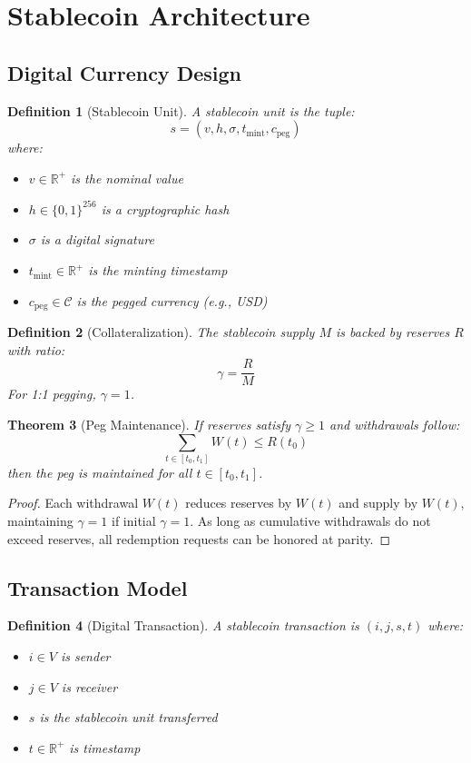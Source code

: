 \documentclass[12pt]{article}
\newtheorem{theorem}{Theorem}
\newtheorem{definition}[theorem]{Definition}
\begin{document}
\section{Stablecoin Architecture}

\subsection{Digital Currency Design}

\begin{definition}[Stablecoin Unit]
A stablecoin unit is the tuple:
$$
s = (v, h, \sigma, t_{\text{mint}}, c_{\text{peg}})
$$
where:
\begin{itemize}
    \item $v \in \mathbb{R}^+$ is the nominal value
    \item $h \in \{0,1\}^{256}$ is a cryptographic hash
    \item $\sigma$ is a digital signature
    \item $t_{\text{mint}} \in \mathbb{R}^+$ is the minting timestamp
    \item $c_{\text{peg}} \in \mathcal{C}$ is the pegged currency (e.g., USD)
\end{itemize}
\end{definition}

\begin{definition}[Collateralization]
The stablecoin supply $M$ is backed by reserves $R$ with ratio:
$$
\gamma = \frac{R}{M}
$$
For 1:1 pegging, $\gamma = 1$.
\end{definition}

\begin{theorem}[Peg Maintenance]
If reserves satisfy $\gamma \geq 1$ and withdrawals follow:
$$
\sum_{t \in [t_0, t_1]} W(t) \leq R(t_0)
$$
then the peg is maintained for all $t \in [t_0, t_1]$.
\end{theorem}

\begin{proof}
Each withdrawal $W(t)$ reduces reserves by $W(t)$ and supply by $W(t)$, maintaining $\gamma = 1$ if initial $\gamma = 1$. As long as cumulative withdrawals do not exceed reserves, all redemption requests can be honored at parity.
\end{proof}

\subsection{Transaction Model}

\begin{definition}[Digital Transaction]
A stablecoin transaction is $(i,j,s,t)$ where:
\begin{itemize}
    \item $i \in V$ is sender
    \item $j \in V$ is receiver
    \item $s$ is the stablecoin unit transferred
    \item $t \in \mathbb{R}^+$ is timestamp
\end{itemize}
\end{definition}
\end{document}
